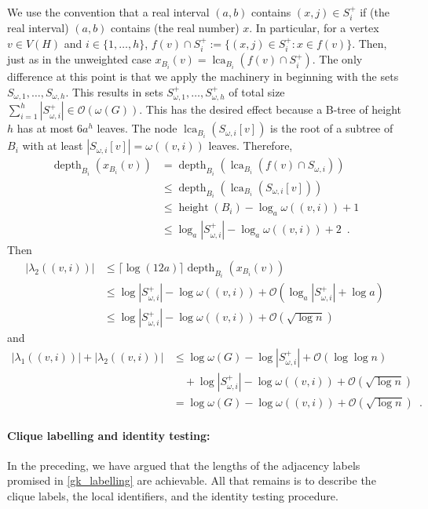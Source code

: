 \documentclass{patmorin}
\renewcommand{\le}{\leqslant}
\DeclareMathOperator{\height}{height}
\DeclareMathOperator{\depth}{depth}
\DeclareMathOperator{\lca}{lca}
\newcommand{\Oh}{\mathcal{O}}
\begin{document}
  We use the convention that a real interval $(a,b)$ contains $(x,j)\in S^+_i$ if (the real interval) $(a,b)$ contains (the real number) $x$. In particular, for a vertex $v\in V(H)$ and $i\in\{1,\ldots,h\}$, $f(v)\cap S^+_i:=\{(x,j)\in S^+_i:x\in f(v)\}$. Then, just as in the unweighted case $x_{B_i}(v)=\lca_{B_i}(f(v)\cap S^+_i)$.  The only difference at this point is that we apply the machinery in \cite{gawrychowski.janczewski:simpler,dujmovic.esperet.ea:adjacency} beginning with the sets $S_{\omega,1},\ldots,S_{\omega,h}$.
  This results in sets $S^+_{\omega,1},\ldots,S^+_{\omega,h}$ of total size $\sum_{i=1}^h |S^+_{\omega,i}|\in \Oh(\omega(G))$.
  This has the desired effect because a B-tree of height $h$ has at most $6a^h$ leaves.
  The node $\lca_{B_i}(S_{\omega,i}[v])$ is the root of a subtree of $B_i$ with at least $|S_{\omega,i}[v]|=\omega((v,i))$ leaves.
  Therefore,
  \begin{align*}
     \depth_{B_i}(x_{B_i}(v))
     & =
     \depth_{B_i}(\lca_{B_i}(f(v)\cap S_{\omega,i})) \\
     & \le
     \depth_{B_i}(\lca_{B_i}(S_{\omega,i}[v])) \\
     & \le\height(B_i)-\log_a\omega((v,i))+1 \\
     & \le \log_a|S^+_{\omega,i}| - \log_a\omega((v,i)) + 2 \enspace .
  \end{align*}
  Then
  \begin{align*}
     |\lambda_2((v,i))|
     & \le \lceil \log(12a)\rceil \depth_{B_i}(x_{B_i}(v)) \\
     & \le \log |S^+_{\omega,i}|-\log \omega((v,i)) + \Oh(\log_a|S^+_{\omega,i}|+ \log a) \\
     & \le \log |S^+_{\omega,i}|-\log \omega((v,i)) + \Oh(\sqrt{\log n})
  \end{align*}
  and
  \begin{align*}
     |\lambda_1((v,i))|+|\lambda_2((v,i))|
     & \le \log\omega(G) - \log |S^+_{\omega,i}| + \Oh(\log\log n) \\
     & \quad {} + \log |S^+_{\omega,i}|-\log \omega((v,i)) + \Oh(\sqrt{\log n}) \\
     & = \log\omega(G) - \log\omega((v,i)) + \Oh(\sqrt{\log n}) \enspace .
  \end{align*}

  \paragraph{Clique labelling and identity testing:}
  In the preceding, we have argued that the lengths of the adjacency labels promised in \cref{gk_labelling} are achievable.
  All that remains is to describe the clique labels, the local identifiers, and the identity testing procedure.
\end{document}

